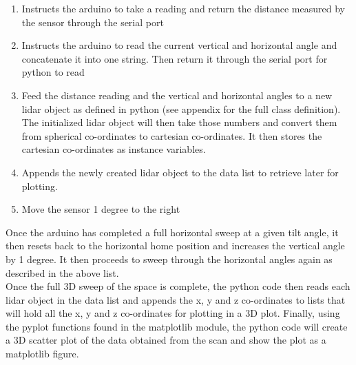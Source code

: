 \documentclass{article}
\begin{document}
\begin{enumerate}
\item Instructs the arduino to take a reading and return the distance measured by the sensor through the serial port
\item Instructs the arduino to read the current vertical and horizontal angle and concatenate it into one string. Then return it through the serial port for python to read
\item Feed the distance reading and the vertical and horizontal angles to a new lidar object as defined in python (see appendix for the full class definition). The initialized lidar object will then take those numbers and convert them from spherical co-ordinates to cartesian co-ordinates. It then stores the cartesian co-ordinates as instance variables.
\item Appends the newly created lidar object to the data list to retrieve later for plotting.
\item Move the sensor 1 degree to the right
\end{enumerate}

Once the arduino has completed a full horizontal sweep at a given tilt angle, it then resets back to the horizontal home position and increases the vertical angle by 1 degree. It then proceeds to sweep through the horizontal angles again as described in the above list. \\

Once the full 3D sweep of the space is complete, the python code then reads each lidar object in the data list and appends the x, y and z co-ordinates to lists that will hold all the x, y and z co-ordinates for plotting in a 3D plot. Finally, using the pyplot functions found in the matplotlib module, the python code will create a 3D scatter plot of the data obtained from the scan and show the plot as a matplotlib figure.
\end{document}
